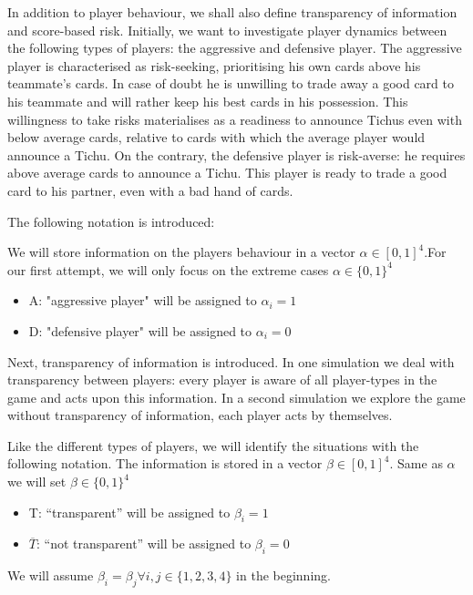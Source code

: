 In addition to player behaviour, we shall also define transparency of information and score-based risk. Initially, we want to investigate player dynamics between the following types of players: the aggressive and defensive player. The aggressive player is characterised as risk-seeking, prioritising his own cards above his teammate’s cards. In case of doubt he is unwilling to trade away a good card to his teammate and will rather keep his best cards in his possession. This willingness to take risks materialises as a readiness to announce Tichus even with below average cards, relative to cards with which the average player would announce a Tichu. On the contrary, the defensive player is risk-averse: he requires above average cards to announce a Tichu. This player is ready to trade a good card to his partner, even with a bad hand of cards.

The following notation is introduced:

We will store information on the players behaviour in a vector $\alpha \in [0,1]^4$.For our first attempt, we will only focus on the extreme cases $\alpha \in \{0,1\}^4$
\\ 
\begin{itemize}
\item A: "aggressive player" will be assigned to $\alpha_i = 1$
\item D: "defensive player" will be assigned to $\alpha_i = 0$ \\
\end{itemize} 

Next, transparency of information is introduced. In one simulation we deal with transparency between players: every player is aware of all player-types in the game and acts upon this information. In a second simulation we explore the game without transparency of information, each player acts by themselves.

Like the different types of players, we will identify the situations with the following notation. The information is stored in a vector $\beta \in [0,1]^4$. Same as $\alpha$ we will set $\beta \in \{0,1\}^4$\\ 
\begin{itemize}
\item T: “transparent” will be assigned to $\beta_i = 1$
\item $\overline{T}$: “not transparent” will be assigned to $\beta_i = 0$ \\
\end{itemize}

We will assume  $\beta_i = \beta_j \forall i, j\in \{1,2,3,4\}$ in the beginning. 

